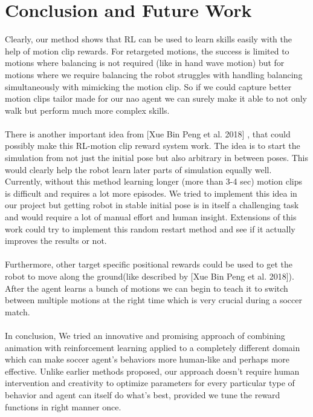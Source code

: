 \chapter{Conclusion and Future Work}

Clearly, our method shows that RL can be used to learn skills easily with the help of motion clip rewards.
For retargeted motions, the success is limited to motions where balancing is not required (like in hand wave motion) but for motions where we require balancing the robot struggles with handling balancing simultaneously with mimicking the motion clip. So if we could capture better motion clips tailor made for our nao agent we can surely make it able to not only walk but perform much more complex skills. 
\\\\
There is another important idea from [Xue Bin Peng et al. 2018] \cite{Peng:2018:DED:3197517.3201311}, that could possibly make this RL-motion clip reward system work. The idea is to start the simulation from not just the initial pose but also arbitrary in between poses. This would clearly help the robot learn later parts of simulation equally well. Currently, without this method learning longer (more than 3-4 sec) motion clips is difficult and requires a lot more episodes. We tried to implement this idea in our project but getting robot in stable initial pose is in itself a challenging task and would require a lot of manual effort and human insight. Extensions of this work could try to implement this random restart method and see if it actually improves the results or not.
\\\\
Furthermore, other target specific positional rewards could be used to get the robot to move along the ground(like described by [Xue Bin Peng et al. 2018]\cite{Peng:2018:DED:3197517.3201311}). After the agent learns a bunch of motions we can begin to teach it to switch between multiple motions at the right time which is very crucial during a soccer match.
\\\\
In conclusion, We tried an innovative and promising approach of combining animation with reinforcement learning applied to a completely different domain which can make soccer agent's behaviors more human-like and perhaps more effective. Unlike earlier methods proposed, our approach doesn't require human intervention and creativity to optimize parameters for every particular type of behavior and agent can itself do what's best, provided we tune the reward functions in right manner once.